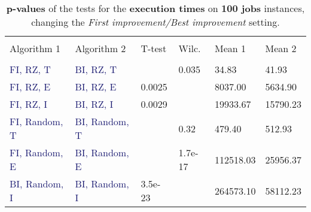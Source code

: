 \documentclass[
12pt,
a4paper,
oneside,
headinclude,
footinclude]{article}
\theoremstyle{definition} %
\begin{document}
\begin{table}[H]
    \begin{tabular}{l l l l l l} %
        \hline
        \hline 
        \\[-1.5ex]
        \textcolor{BrickRed}{Algorithm 1} & \textcolor{BrickRed}{Algorithm 2} & \textcolor{BrickRed}{T-test} & \textcolor{BrickRed}{Wilc.} & \textcolor{BrickRed}{Mean 1} & \textcolor{BrickRed}{Mean 2}\\ [0.5ex]
        \hline %
        \\[-1.5ex]
        \textcolor{MidnightBlue}{FI, RZ, T}     & \textcolor{MidnightBlue}{BI, RZ, T}     &  & 0.035 &  34.83 & 41.93 \\ 
        \textcolor{MidnightBlue}{FI, RZ, E}     & \textcolor{MidnightBlue}{BI, RZ, E}     & 0.0025 &  & 8037.00 & 5634.90 \\ 
        \textcolor{MidnightBlue}{FI, RZ, I}     & \textcolor{MidnightBlue}{BI, RZ, I}     & 0.0029 &  & 19933.67 & 15790.23 \\ 
        \textcolor{MidnightBlue}{FI, Random, T} & \textcolor{MidnightBlue}{BI, Random, T} &  & 0.32 &  479.40 & 512.93 \\ 
        \textcolor{MidnightBlue}{FI, Random, E} & \textcolor{MidnightBlue}{BI, Random, E} &  & 1.7e-17 &  112518.03 & 25956.37 \\ 
        \textcolor{MidnightBlue}{BI, Random, I} & \textcolor{MidnightBlue}{BI, Random, I} & 3.5e-23 &  & 264573.10 & 58112.23 \\ 
        [1ex] %
        \hline %
    \end{tabular}
    \caption{\label{tab:ii-ty100ex}\textbf{p-values} of the tests for the \textbf{execution times} on \textbf{100 jobs} instances, changing the \textit{First improvement/Best improvement} setting.}
\end{table} 
\end{document}
